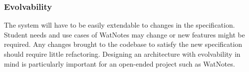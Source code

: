 \documentclass[12pt]{article}
\begin{document}
  \subsubsection{Evolvability}
  The system will have to be easily extendable to changes in the specification. Student needs and use cases of WatNotes may change or new features might be required. Any changes brought to the codebase to satisfy the new specification should require little refactoring. Designing an architecture with evolvability in mind is particularly important for an open-ended project such as WatNotes.
\end{document}
